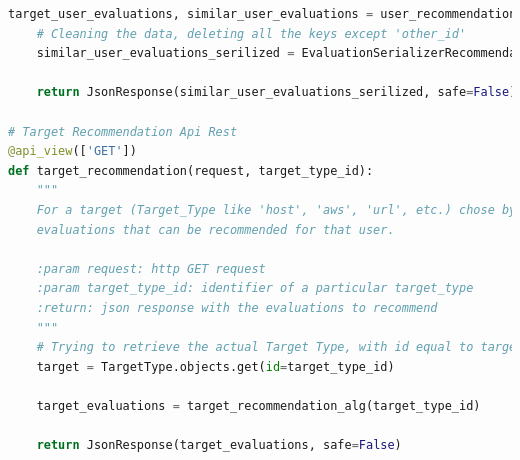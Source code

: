\begin{lstlisting}[language=Python, label=lst:view_rec, caption={Porzione parziale del codice contenuto nelle View per implementare
    i sistemi di raccomandazione.}]
    target_user_evaluations, similar_user_evaluations = user_recommendation_alg(user_other_id)
    # Cleaning the data, deleting all the keys except 'other_id'
    similar_user_evaluations_serilized = EvaluationSerializerRecommendation(similar_user_evaluations, many=True).data
 
    return JsonResponse(similar_user_evaluations_serilized, safe=False)
 
# Target Recommendation Api Rest
@api_view(['GET'])
def target_recommendation(request, target_type_id):
    """
    For a target (Target_Type like 'host', 'aws', 'url', etc.) chose by a user this algorithm search the possible
    evaluations that can be recommended for that user.
 
    :param request: http GET request
    :param target_type_id: identifier of a particular target_type
    :return: json response with the evaluations to recommend
    """
    # Trying to retrieve the actual Target Type, with id equal to target_type_id, chosed by a user
    target = TargetType.objects.get(id=target_type_id)
 
    target_evaluations = target_recommendation_alg(target_type_id)
 
    return JsonResponse(target_evaluations, safe=False)
\end{lstlisting}
\lstset{style=python_code_style}
